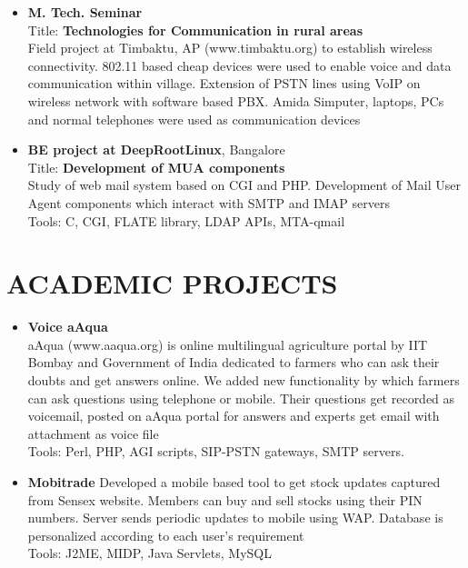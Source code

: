 \documentclass{res}
\begin{document}
\begin{resume}
\begin{itemize}
                     \item {\bf M. Tech. Seminar} \\
					 Title: {\bf Technologies for Communication in rural areas}\\
	Field project at Timbaktu, AP (www.timbaktu.org) to establish wireless connectivity. 802.11 based cheap devices were used to enable voice and data communication within village. Extension of PSTN lines using VoIP on wireless network with software based PBX. Amida Simputer, laptops, PCs and normal telephones were used as communication devices 

	                \item {\bf BE project at DeepRootLinux}, Bangalore\\
				Title: {\bf Development of MUA components} \\
				Study of web mail system based on CGI and PHP. Development of Mail User Agent components which interact with SMTP and IMAP servers\\
				Tools: C, CGI, FLATE library, LDAP APIs, MTA-qmail

					  \end{itemize}


					  \section{ACADEMIC PROJECTS}

					  \begin{itemize}
					  \item {\bf Voice aAqua}\\
						aAqua (www.aaqua.org) is online multilingual agriculture portal by IIT Bombay and Government of India dedicated to farmers who can ask their doubts and get answers online. We added new functionality by which farmers can ask questions using telephone or mobile. Their questions get recorded as voicemail, posted on aAqua portal for answers and experts get email with attachment as voice file\\
	Tools: Perl, PHP, AGI scripts, SIP-PSTN gateways, SMTP servers.
					  
					  \item {\bf Mobitrade}
					  Developed a mobile based tool to get stock updates captured from Sensex website. Members can buy and sell stocks using their PIN numbers. Server sends periodic updates to mobile using WAP. Database is personalized according to each user’s requirement\\
					  Tools: J2ME, MIDP, Java Servlets, MySQL
					  \end{itemize}

\end{resume}
\end{document}
